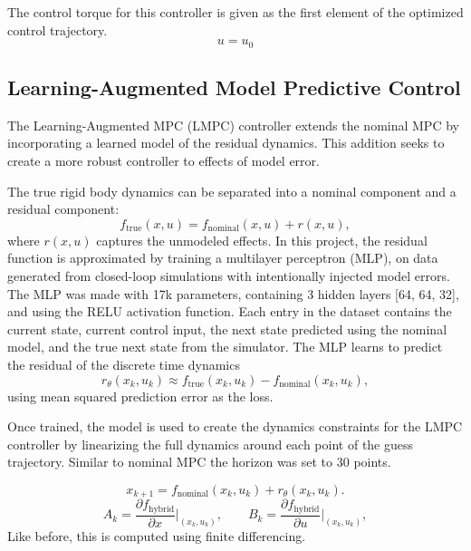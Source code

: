 \documentclass[conference]{IEEEtran}
\begin{document}
The control torque for this controller is given as the first element of the optimized 
control trajectory.
\begin{equation}
u = u_0
\end{equation}

\subsection{Learning-Augmented Model Predictive Control}
The Learning-Augmented MPC (LMPC) controller extends the nominal MPC 
by incorporating a learned model of the residual dynamics. This addition seeks
to create a more robust controller to effects of model error.

The true rigid body dynamics can be separated into a nominal component  
and a residual component:
\begin{equation}
f_{\text{true}}(x,u) = f_{\text{nominal}}(x,u) + r(x,u),
\end{equation}
where \( r(x,u) \) captures the unmodeled effects. In this project,
the residual function is approximated by training a multilayer perceptron (MLP), 
on data generated from closed-loop simulations with intentionally injected model errors. 
The MLP was made with 17k parameters, containing 3 hidden layers [64, 64, 32], and using 
the RELU activation function.
Each entry in the dataset contains the 
current state, current control input, the next state predicted using the nominal  
model, and the true next state from the simulator. The MLP learns to predict 
the residual of the discrete time dynamics
\begin{equation}
r_\theta(x_k,u_k) \approx f_{\text{true}}(x_k,u_k) - f_{\text{nominal}}(x_k,u_k),
\end{equation}
using mean squared prediction error as the loss.

Once trained, the model is used to create the dynamics constraints 
for the LMPC controller by linearizing the full dynamics around each point 
of the guess trajectory. Similar to nominal MPC the horizon was set to 30 points.

\begin{equation}
x_{k+1} = f_{\text{nominal}}(x_k, u_k) + r_\theta(x_k, u_k).
\end{equation}
\begin{equation}
A_k = \frac{\partial f_{\text{hybrid}}}{\partial x}\bigg|_{(x_k,u_k)}, \qquad 
B_k = \frac{\partial f_{\text{hybrid}}}{\partial u}\bigg|_{(x_k,u_k)},
\end{equation}
Like before, this is computed using finite differencing.
\end{document}
